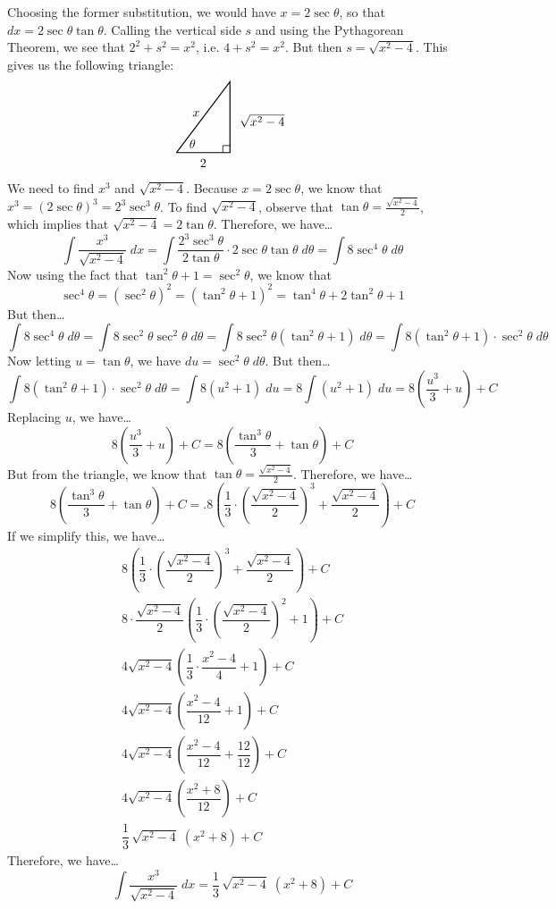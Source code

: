 \documentclass[11pt,letterpaper]{article}
\begin{document}
Choosing the former substitution, we would have $x= 2 \sec \theta$, so that $dx= 2 \sec \theta \tan \theta$. Calling the vertical side $s$ and using the Pythagorean Theorem, we see that $2^2 + s^2= x^2$, i.e. $4 + s^2= x^2$. But then $s= \sqrt{x^2 - 4}$. This gives us the following triangle: 
	\[
	\begin{tikzpicture}
	\draw[line width=0.03cm] (0,0) -- (1.5,0) -- (1.5,2) -- (0,0);
	\draw[line width=0.02cm] (1.3,0) -- (1.3,0.2) -- (1.5,0.2);
	\node at (0.45,0.25) {$\theta$};
	\node at (0.55,1.1) {$x$};
	\node at (0.75,-0.3) {$2$};
	\node at (2.4,0.9) {$\sqrt{x^2 - 4}$};
	\end{tikzpicture}
	\]
We need to find $x^3$ and $\sqrt{x^2 - 4}$. Because $x= 2 \sec \theta$, we know that $x^3= (2 \sec \theta)^3= 2^3 \sec^3 \theta$. To find $\sqrt{x^2 - 4}$, observe that $\tan \theta= \frac{\sqrt{x^2 - 4}}{2}$, which implies that $\sqrt{x^2 - 4}= 2 \tan \theta$. Therefore, we have\dots
	\[
	\int \dfrac{x^3}{\sqrt{x^2 - 4}} \;dx= \int \dfrac{2^3 \sec^3 \theta}{2 \tan \theta} \cdot 2 \sec \theta \tan \theta \;d\theta= \int 8 \sec^4 \theta \;d\theta
	\]
Now using the fact that $\tan^2 \theta + 1= \sec^2 \theta$, we know that 
	\[
	\sec^4 \theta= (\sec^2 \theta)^2= (\tan^2 \theta + 1)^2= \tan^4 \theta + 2 \tan^2 \theta + 1
	\]
But then\dots
	\[
	\int 8 \sec^4 \theta \;d\theta= \int 8 \sec^2 \theta \sec^2 \theta \;d\theta= \int 8 \sec^2 \theta (\tan^2 \theta + 1) \;d\theta= \int 8(\tan^2 \theta + 1) \cdot \sec^2 \theta \;d\theta
	\]
Now letting $u= \tan \theta$, we have $du= \sec^2 \theta \;d\theta$. But then\dots
	\[
	\int 8(\tan^2 \theta + 1) \cdot \sec^2 \theta \;d\theta= \int 8(u^2 + 1) \;du= 8 \int (u^2 + 1) \;du= 8 \left( \dfrac{u^3}{3} + u \right) + C
	\]
Replacing $u$, we have\dots
	\[
	8 \left( \dfrac{u^3}{3} + u \right) + C= 8 \left( \dfrac{\tan^3 \theta}{3} + \tan \theta \right) + C
	\]
But from the triangle, we know that $\tan \theta= \frac{\sqrt{x^2 - 4}}{2}$. Therefore, we have\dots
	\[
	8 \left( \dfrac{\tan^3 \theta}{3} + \tan \theta \right) + C=. 8 \left( \dfrac{1}{3} \cdot \left( \dfrac{\sqrt{x^2 - 4}}{2} \right)^3 + \dfrac{\sqrt{x^2 - 4}}{2} \right) + C
	\]
If we simplify this, we have\dots
	\[
	\begin{gathered}
	8 \left( \dfrac{1}{3} \cdot \left( \dfrac{\sqrt{x^2 - 4}}{2} \right)^3 + \dfrac{\sqrt{x^2 - 4}}{2} \right) + C \\
	8 \cdot \dfrac{\sqrt{x^2 - 4}}{2} \left( \dfrac{1}{3} \cdot \left( \dfrac{\sqrt{x^2 - 4}}{2} \right)^2 + 1 \right) + C \\
	4 \sqrt{x^2 - 4} \left( \dfrac{1}{3} \cdot \dfrac{x^2 - 4}{4} + 1 \right) + C \\
	4 \sqrt{x^2 - 4} \left( \dfrac{x^2 - 4}{12} + 1 \right) + C \\
	4 \sqrt{x^2 - 4} \left( \dfrac{x^2 - 4}{12} + \dfrac{12}{12} \right) + C \\
	4 \sqrt{x^2 - 4} \left( \dfrac{x^2 + 8}{12}\right) + C \\
	\dfrac{1}{3}\, \sqrt{x^2 - 4}\; (x^2 + 8) + C
	\end{gathered}
	\]
Therefore, we have\dots
	\[
	\int \dfrac{x^3}{\sqrt{x^2 - 4}} \;dx= \dfrac{1}{3}\, \sqrt{x^2 - 4}\; (x^2 + 8) + C
	\] \pvspace{1.3cm}
\end{document}
